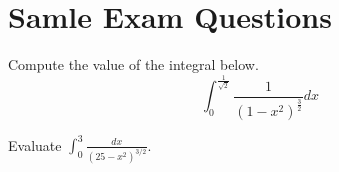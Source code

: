 \documentclass{ximera}
\begin{document}
\section*{Samle Exam Questions}

\begin{question}%

Compute the value of the integral below.
\[ \int_0^{\frac{1}{\sqrt{2}}} \frac{1}{(1-x^2)^{\frac{3}{2}}} dx \]
\begin{multiplechoice}
\end{multiplechoice}

\end{question}

\begin{question}%

Evaluate \(\displaystyle \int_0^3 \frac{dx}{(25-x^2)^{3/2}}\).
\begin{multiplechoice}
\end{multiplechoice}

\end{question}
\end{document}
